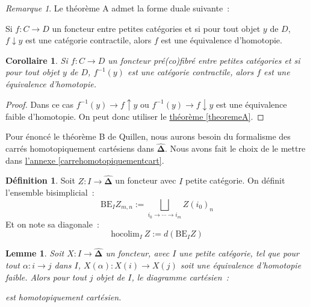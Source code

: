 \documentclass{amsart}
\newcommand{\sref}[2]{\hyperref[#2]{#1 \ref*{#2}}}
\theoremstyle{plain}
\newtheorem{coro}[theo]{Corollaire}
\newtheorem{lem}[theo]{Lemme}
\theoremstyle{definition}
\newtheorem{defi}[theo]{Définition}
\theoremstyle{remark}
\newtheorem{rem}[theo]{Remarque}
\newcommand{\DEns}{\widehat{\mathbf{\Delta}}}
\newcommand{\hocolim}[2]{\mathrm{hocolim}_{#1}\:{#2}}
\newcommand{\ra}{\rightarrow}
\begin{document}
\begin{rem}
  Le théorème A admet la forme duale suivante~:

  Si $f:C\ra D$ un foncteur entre petites catégories et si pour tout objet $y$ de $D$, $f\downarrow y$ est une catégorie contractile,
  alors $f$ est une équivalence d'homotopie.
\end{rem}

\begin{coro}
  Si $f:C\ra D$ un foncteur pré(co)fibré entre petites catégories et si pour tout objet $y$ de $D$, $f^{-1}(y)$ est une catégorie contractile,
  alors $f$ est une équivalence d'homotopie.
\end{coro}
\begin{proof}
  Dans ce cas $f^{-1}(y)\ra f\uparrow y$ ou $f^{-1}(y)\ra f\downarrow y$ est une équivalence faible d'homotopie. On peut donc utiliser
  le \sref{théorème}{theoremeA}.
\end{proof}

Pour énoncé le théorème B de Quillen, nous aurons besoin du formalisme des carrés homotopiquement cartésiens dans $\DEns$.
Nous avons fait le choix de le mettre dans \sref{l'annexe}{carrehomotopiquementcart}.

\begin{defi}
  Soit $Z:I\ra \DEns$ un foncteur avec $I$ petite catégorie. On définit l'ensemble bisimplicial~:
  $$\mathrm{BE}_IZ_{m,n}:=\bigsqcup_{i_0\ra\dotsb\ra i_m}Z(i_0)_n$$
  Et on note sa diagonale~:
  $$\hocolim{I}{Z}:=d(\mathrm{BE}_IZ)$$
\end{defi}

\begin{lem}\label{lemmetheoremeB}
  Soit $X:I\ra \DEns$ un foncteur, avec $I$ une petite catégorie, tel que pour tout $\alpha:i\ra j$ dans $I$,
  $X(\alpha): X(i)\ra X(j)$ soit une équivalence d'homotopie faible. Alors pour tout $j$ objet de $I$, le diagramme cartésien~:
  \begin{center}
  \end{center}
  est homotopiquement cartésien.
\end{lem}
\end{document}

